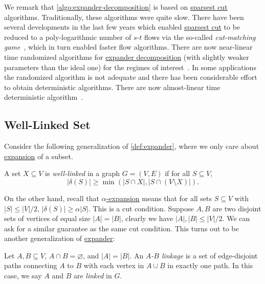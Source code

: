 We remark that \autoref{algo:expander-decomposition} is based on \hyperref[prb:sparsest-cut]{sparsest cut} algorithms. Traditionally, these algorithms were quite slow. There have been several developments in the last few years which enabled \hyperref[prb:sparsest-cut]{sparsest cut} to be reduced to a poly-logarithmic number of \(s\)-\(t\) flows via the so-called \emph{cut-matching game}~\cite{khandekar2009graph,orecchia2008partitioning}, which in turn enabled faster flow algorithms. There are now near-linear time randomized algorithms for \hyperref[def:expander-decomposition]{expander decomposition} (with slightly weaker parameters than the ideal one) for the regimes of interest~\cite{saranurak2019expander}. In some applications the randomized algorithm is not adequate and there has been considerable effort to obtain deterministic algorithms. There are now almost-linear time deterministic algorithm~\cite{chuzhoy2020deterministic,saranurak2021deterministic}.

\subsection{Well-Linked Set}
Consider the following generalization of \autoref{def:expander}, where we only care about \hyperref[def:expansion]{expansion} of a subset.

\begin{definition}\label{def:well-linked}
	A set \(X \subseteq V\) is \emph{well-linked} in a graph \(G = (V, E)\) if for all \(S \subseteq V\),
	\[
		\lvert \delta (S) \rvert
		\geq \min (\lvert S \cap X \rvert , \lvert S \cap (V \setminus X) \rvert ).
	\]
\end{definition}

On the other hand, recall that \hyperref[def:expansion]{\(\alpha \)-expansion} means that for all sets \(S \subseteq V\) with \(\lvert S \rvert \leq \lvert V \rvert / 2\), \(\lvert \delta (S) \rvert \geq \alpha \lvert S \rvert \). This is a cut condition. Suppose \(A, B\) are two disjoint sets of vertices of equal size \(\lvert A \rvert = \lvert B \rvert \), clearly we have \(\lvert A \rvert , \lvert B \rvert \leq \lvert V \rvert / 2\). We can ask for a similar guarantee as the same cut condition. This turns out to be another generalization of \hyperref[def:expander]{expander}:

\begin{definition}[Linkage]\label{def:linkage}
	Let \(A, B \subseteq V\), \(A \cap B = \varnothing \), and \(\lvert A \rvert = \lvert B \rvert \). An \emph{\(A\)-\(B\) linkage} is a set of edge-disjoint paths connecting \(A\) to \(B\) with each vertex in \(A \cup B\) in exactly one path. In this case, we say \(A\) and \(B\) are \emph{linked} in \(G\).
\end{definition}

